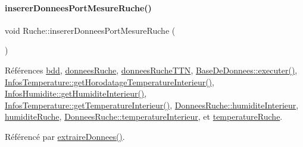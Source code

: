 \paragraph{\texorpdfstring{inserer\+Donnees\+Port\+Mesure\+Ruche()}{insererDonneesPortMesureRuche()}}
{\footnotesize\ttfamily void Ruche\+::inserer\+Donnees\+Port\+Mesure\+Ruche (\begin{DoxyParamCaption}{ }\end{DoxyParamCaption})\hspace{0.3cm}{\ttfamily [private]}}



Références \hyperlink{class_ruche_a8577fdedabdecd98652e338e83bb3b65}{bdd}, \hyperlink{class_ruche_a1526bfa78f03e0710ad16f880a40c15f}{donnees\+Ruche}, \hyperlink{class_ruche_a4556832042641c08a6ef2ab9d80d771e}{donnees\+Ruche\+T\+TN}, \hyperlink{class_base_de_donnees_aa8de5f8f8bb17edc43f5c0ee33712081}{Base\+De\+Donnees\+::executer()}, \hyperlink{class_infos_temperature_aca40f109786cf22d78402f8b7f3fe408}{Infos\+Temperature\+::get\+Horodatage\+Temperature\+Interieur()}, \hyperlink{class_infos_humidite_a652f7ca3e4b97352034fed62c6d865b7}{Infos\+Humidite\+::get\+Humidite\+Interieur()}, \hyperlink{class_infos_temperature_aaf4cb4fd8a7c46d14955d3175498f91c}{Infos\+Temperature\+::get\+Temperature\+Interieur()}, \hyperlink{struct_donnees_ruche_a2541ee93816a11da7367b36d4bedc77b}{Donnees\+Ruche\+::humidite\+Interieur}, \hyperlink{class_ruche_acb380928928e693a1933c4cf607ddf80}{humidite\+Ruche}, \hyperlink{struct_donnees_ruche_ad6cbda133d2c8abc23fb688d6e565ab2}{Donnees\+Ruche\+::temperature\+Interieur}, et \hyperlink{class_ruche_af721fb92f801a9b1f3ef3aa9867cf3de}{temperature\+Ruche}.



Référencé par \hyperlink{class_ruche_a21c0dafeaec03d451590037343e6a3ca}{extraire\+Donnees()}.


